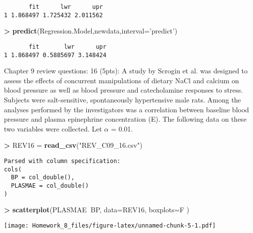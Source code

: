 \documentclass[]{article}
\newenvironment{Shaded}{\begin{snugshade}}{\end{snugshade}}
\newcommand{\KeywordTok}[1]{\textcolor[rgb]{0.13,0.29,0.53}{\textbf{#1}}}
\newcommand{\DataTypeTok}[1]{\textcolor[rgb]{0.13,0.29,0.53}{#1}}
\newcommand{\StringTok}[1]{\textcolor[rgb]{0.31,0.60,0.02}{#1}}
\newcommand{\OperatorTok}[1]{\textcolor[rgb]{0.81,0.36,0.00}{\textbf{#1}}}
\newcommand{\NormalTok}[1]{#1}
\begin{document}
\begin{verbatim}
       fit      lwr      upr
1 1.868497 1.725432 2.011562
\end{verbatim}

\begin{Shaded}
\begin{Highlighting}[]
\OperatorTok{>}\StringTok{ }\KeywordTok{predict}\NormalTok{(Regression.Model,newdata,}\DataTypeTok{interval=}\StringTok{'predict'}\NormalTok{)}
\end{Highlighting}
\end{Shaded}

\begin{verbatim}
       fit       lwr      upr
1 1.868497 0.5885697 3.148424
\end{verbatim}

Chapter 9 review questions: 16 (5pts): A study by Scrogin et al. was
designed to assess the effects of concurrent manipulations of dietary
NaCl and calcium on blood pressure as well as blood pressure and
catecholamine responses to stress. Subjects were salt-sensitive,
spontaneously hypertensive male rats. Among the analyses performed by
the investigators was a correlation between baseline blood pressure and
plasma epinephrine concentration (E). The following data on these two
variables were collected. Let \(\alpha\) = 0.01.

\begin{Shaded}
\begin{Highlighting}[]
\OperatorTok{>}\StringTok{ }\NormalTok{REV16 =}\StringTok{ }\KeywordTok{read_csv}\NormalTok{(}\StringTok{"REV_C09_16.csv"}\NormalTok{)}
\end{Highlighting}
\end{Shaded}

\begin{verbatim}
Parsed with column specification:
cols(
  BP = col_double(),
  PLASMAE = col_double()
)
\end{verbatim}

\begin{Shaded}
\begin{Highlighting}[]
\OperatorTok{>}\StringTok{ }\KeywordTok{scatterplot}\NormalTok{(PLASMAE}\OperatorTok{~}\NormalTok{BP, }\DataTypeTok{data=}\NormalTok{REV16, }\DataTypeTok{boxplots=}\NormalTok{F )}
\end{Highlighting}
\end{Shaded}

\texttt{[image: Homework\_8\_files/figure-latex/unnamed-chunk-5-1.pdf]}
\end{document}
